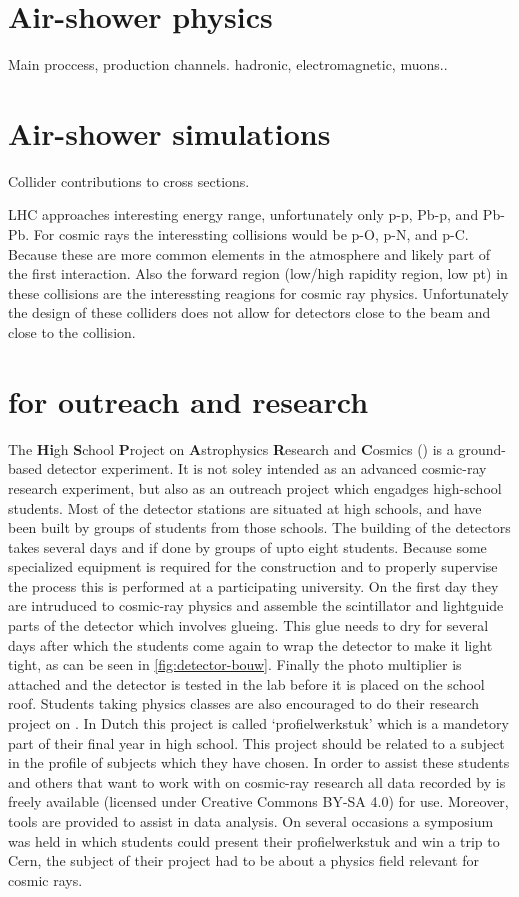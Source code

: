 \section{Air-shower physics}

Main proccess, production channels. hadronic, electromagnetic, muons..


\section{Air-shower simulations}

Collider contributions to cross sections.

LHC approaches interesting energy range, unfortunately only p-p, Pb-p, and Pb-Pb. For cosmic rays the interessting collisions would be p-O, p-N, and p-C. Because these are more common elements in the atmosphere and likely part of the first interaction. Also the forward region (low/high rapidity region, low pt) in these collisions are the interessting reagions for cosmic ray physics. Unfortunately the design of these colliders does not allow for detectors close to the beam and close to the collision.


\section{\hisparc for outreach and research}

The \textbf{Hi}gh \textbf{S}chool \textbf{P}roject on \textbf{A}strophysics \textbf{R}esearch and \textbf{C}osmics (\hisparc) is a ground-based detector experiment. It is not soley intended as an advanced cosmic-ray research experiment, but also as an outreach project which engadges high-school students. Most of the \hisparc detector stations are situated at high schools, and have been built by groups of students from those schools. The building of the detectors takes several days and if done by groups of upto eight students. Because some specialized equipment is required for the construction and to properly supervise the process this is performed at a participating university. On the first day they are intruduced to cosmic-ray physics and assemble the scintillator and lightguide parts of the detector which involves glueing. This glue needs to dry for several days after which the students come again to wrap the detector to make it light tight, as can be seen in \cref{fig:detector-bouw}. Finally the photo multiplier is attached and the detector is tested in the lab before it is placed on the school roof. Students taking physics classes are also encouraged to do their research project on \hisparc. In Dutch this project is called `profielwerkstuk' which is a mandetory part of their final year in high school. This project should be related to a subject in the profile of subjects which they have chosen. In order to assist these students and others that want to work with on cosmic-ray research all data recorded by \hisparc is freely available (licensed under Creative Commons BY-SA 4.0) for use. Moreover, tools are provided to assist in data analysis. On several occasions a symposium was held in which students could present their profielwerkstuk and win a trip to Cern, the subject of their project had to be about a physics field relevant for cosmic rays.

